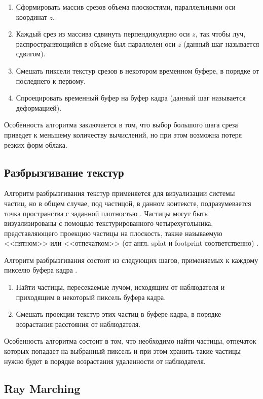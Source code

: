 \begin{enumerate}
	\item Сформировать массив срезов объема плоскостями, параллельными оси координат $z$.
	\item Каждый срез из массива сдвинуть перпендикулярно оси $z$, так чтобы луч, распространяющийся в объеме был параллелен оси $z$ (данный шаг называется сдвигом). 
	\item Смешать пиксели текстур срезов в некотором временном буфере, в порядке от последнего к первому.
	\item Спроецировать временный буфер на буфер кадра (данный шаг называется деформацией).
\end{enumerate}

Особенность алгоритма заключается в том, что выбор большого шага среза приведет к меньшему количеству вычислений, но при этом возможна потеря резких форм облака.


\subsection{Разбрызгивание текстур}
\label{splatting}
Алгоритм разбрызгивания текстур применяется для визуализации системы частиц, но в общем случае, под частицой, в данном контексте, подразумевается точка пространства с заданной плотностью \cite{clouds}.
Частицы могут быть визуализированы с помощью текстурированного четырехугольника, представляющего проекцию частицы на плоскость, также называемую <<пятном>> или <<отпечатком>> (от англ. splat и footprint соответственно) \cite{clouds, voxel}. 

Алгоритм разбрызгивания состоит из следующих шагов, применяемых к каждому пикселю буфера кадра \cite{voxel, clouds}.
\begin{enumerate}
	\item Найти частицы, пересекаемые лучом, исходящим от наблюдателя и приходящим в некоторый пиксель буфера кадра.
	\item Смешать проекции текстур этих частиц в буфере кадра, в порядке возрастания расстояния от наблюдателя.
\end{enumerate} 

Особенность алгоритма состоит в том, что необходимо найти частицы, отпечаток которых попадает на выбранный пиксель и при этом хранить такие частицы нужно будет в порядке возрастания удаленности от наблюдателя.

\subsection{Ray Marching}
\label{ray}

